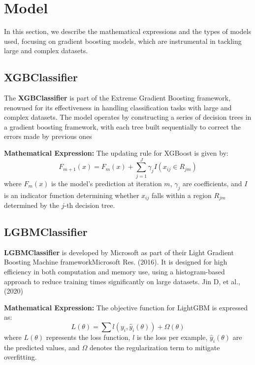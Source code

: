 \documentclass[12pt]{article}
\begin{document}
\maketitle

\section{Model}
In this section, we describe the mathematical expressions and the types of models used, focusing on gradient boosting models, which are instrumental in tackling large and complex datasets.

\subsection{XGBClassifier}
The \textbf{XGBClassifier} is part of the Extreme Gradient Boosting framework, renowned for its effectiveness in handling classification tasks with large and complex datasets. The model operates by constructing a series of decision trees in a gradient boosting framework, with each tree built sequentially to correct the errors made by previous ones \cite{Friedman2001} 

\textbf{Mathematical Expression:}
The updating rule for XGBoost is given by:
\[
F_{m+1}(x) = F_m(x) + \sum_{j=1}^J \gamma_j I(x_{ij} \in R_{jm})
\]
where \( F_m(x) \) is the model's prediction at iteration \( m \), \( \gamma_j \) are coefficients, and \( I \) is an indicator function determining whether \( x_{ij} \) falls within a region \( R_{jm} \) determined by the \( j \)-th decision tree.

\subsection{LGBMClassifier}
\textbf{LGBMClassifier} is developed by Microsoft  as part of their Light Gradient Boosting Machine frameworkMicrosoft Res. (2016). It is designed for high efficiency in both computation and memory use, using a histogram-based approach to reduce training times significantly on large datasets. Jin D, et al., (2020)
 

\textbf{Mathematical Expression:}
The objective function for LightGBM is expressed as:
\[
L(\theta) = \sum l(y_i, \hat{y}_i(\theta)) + \Omega(\theta)
\]
where \( L(\theta) \) represents the loss function, \( l \) is the loss per example, \( \hat{y}_i(\theta) \) are the predicted values, and \( \Omega \) denotes the regularization term to mitigate overfitting.
\end{document}
